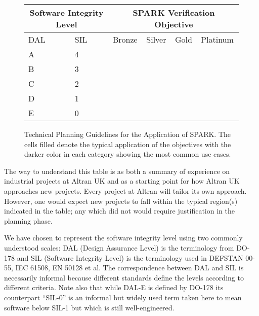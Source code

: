 \documentclass{llncs}
\begin{document}
\begin{figure}

\begin{center}
\begin{tabular}{|p{1.5cm}|p{1.5cm}|p{1.5cm}|p{1.5cm}|p{1.5cm}|p{1.5cm}|} \hline
\multicolumn{2}{|c|}{Software Integrity Level} & \multicolumn{4}{c|}{SPARK Verification Objective} \\  \hline
DAL & SIL & Bronze & Silver & Gold & Platinum \\ \hline
A   & 4   &        & \cellcolor{black} & \cellcolor{black} & \cellcolor{black} \\ \hline
B   & 3   &        & \cellcolor{black} & \cellcolor{black} & \cellcolor{black!70} \\ \hline
C   & 2   &        & \cellcolor{black!50} & \cellcolor{black!50} & \\ \hline
D   & 1   &        & \cellcolor{black!50} & \cellcolor{black!40} & \\ \hline
E   & 0   & \cellcolor{gray!10} & \cellcolor{gray!30} & & \\ \hline
\end{tabular}
\end{center}

\caption{Technical Planning Guidelines for the Application of SPARK.  The
  cells filled denote the typical application of the objectives with the
  darker color in each category showing the most common use cases.}
\label{fig:levels}
\end{figure}

The way to understand this table is as both a summary of experience on
industrial projects at Altran UK and as a starting point for how Altran UK
approaches new projects. Every project at Altran will tailor its own
approach. However, one would expect new projects to fall within the typical
region(s) indicated in the table; any which did not would require justification
in the planning phase.

We have chosen to represent the software integrity level using two commonly
understood scales: DAL (Design Assurance Level) is the terminology from DO-178
and SIL (Software Integrity Level) is the terminology used in DEFSTAN 00-55,
IEC 61508, EN 50128 et al. The correspondence between DAL and SIL is
necessarily informal because different standards define the levels according to
different criteria. Note also that while DAL-E is defined by DO-178 its
counterpart ``SIL-0'' is an informal but widely used term taken here to mean
software below SIL-1 but which is still well-engineered.
\end{document}
